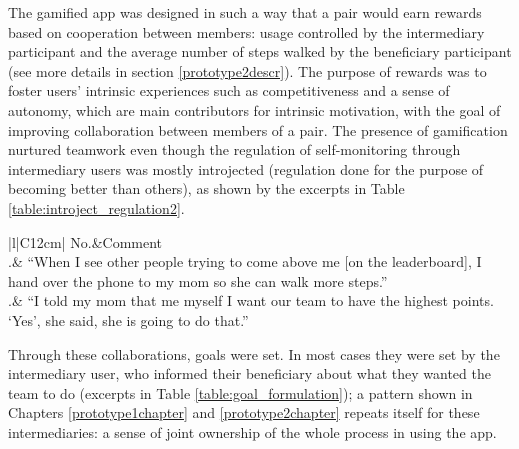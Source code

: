 The gamified app was designed in such a way that a pair would earn rewards based on cooperation between members: usage controlled by the intermediary participant and the average number of steps walked by the beneficiary participant (see more details in section \ref{prototype2descr}). The purpose of rewards was to foster users' intrinsic experiences such as competitiveness and a sense of autonomy, which are main contributors for intrinsic motivation, with the goal of improving collaboration between members of a pair. The presence of gamification nurtured teamwork even though the regulation of self-monitoring through intermediary users was mostly introjected (regulation done for the purpose of becoming better than others), as shown by the excerpts in Table \ref{table:introject_regulation2}.

\begin{table}[h!]
\renewcommand{\baselinestretch}{1.5}
  \begin{center}
    \caption{Excerpts: examples of teamwork as a result of competition from others.}
    \label{table:introject_regulation2}
	\begin{tabular}{|l|C{12cm}|}
		\hline
		No.&Comment\\
		.& {``When I see other people trying to come above me [on the leaderboard], I hand over the phone to my mom so she can walk more steps.''}~\citep{katule2016family}\\
		.& {``I told my mom that me myself I want our team to have the highest points. `Yes', she said, she is going to do that.''}~\citep{katule2016family}\\
		\hline
	\end{tabular}
  \end{center}
\end{table}

Through these collaborations, goals were set. In most cases they were set by the intermediary user, who informed their beneficiary about what they wanted the team to do (excerpts in Table \ref{table:goal_formulation}); a pattern shown in Chapters \ref{prototype1chapter} and \ref{prototype2chapter} repeats itself for these intermediaries: a sense of joint ownership of the whole process in using the app. 

